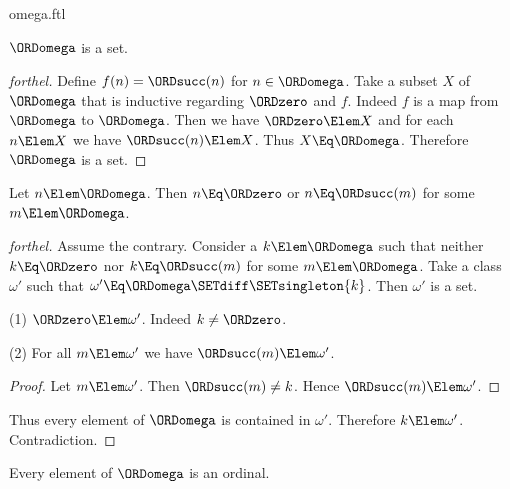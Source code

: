 \documentclass{stex}
\begin{document}
\begin{smodule}{omega.ftl}
\begin{corollary}[forthel,id=SET_THEORY_03_4847727433220096]
  $\ORDomega$ is a set.
\end{corollary}
\begin{proof}[forthel]
  Define $f(n) = \ORDsucc(n)$ for $n \in \ORDomega$.
  Take a subset $X$ of $\ORDomega$ that is inductive regarding $\ORDzero$ and $f$.
  Indeed $f$ is a map from $\ORDomega$ to $\ORDomega$.
  Then we have $\ORDzero \Elem X$ and for each $n \Elem X$ we have $\ORDsucc(n) \Elem X$.
  Thus $X \Eq \ORDomega$.
  Therefore $\ORDomega$ is a set.
\end{proof}

\begin{proposition}[forthel,id=SET_THEORY_03_5885789275684864]
  Let $n \Elem \ORDomega$.
  Then $n \Eq \ORDzero$ or $n \Eq \ORDsucc(m)$ for some $m \Elem \ORDomega$.
\end{proposition}
\begin{proof}[forthel]
  Assume the contrary.
  Consider a $k \Elem \ORDomega$ such that neither $k \Eq \ORDzero$ nor $k \Eq \ORDsucc(m)$ for
  some $m \Elem \ORDomega$.
  Take a class $\omega'$ such that $\omega' \Eq \ORDomega \SETdiff \SETsingleton{k}$. %
  Then $\omega'$ is a set.

  (1) $\ORDzero \Elem \omega'$.
  Indeed $k \neq \ORDzero$.

  (2) For all $m \Elem \omega'$ we have $\ORDsucc(m) \Elem \omega'$.
  \begin{proof}
    Let $m \Elem \omega'$.
    Then $\ORDsucc(m) \neq k$.
    Hence $\ORDsucc(m) \Elem \omega'$.
  \end{proof}

  Thus every element of $\ORDomega$ is contained in $\omega'$.
  Therefore $k \Elem \omega'$.
  Contradiction.
\end{proof}

\begin{proposition}[forthel,id=SET_THEORY_03_5057540872208384]
  Every element of $\ORDomega$ is an ordinal.
\end{proposition}
\end{smodule}
\end{document}
